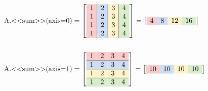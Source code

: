 \begin{align*}
\text{\li{A.<<sum>>(axis=0)}} &= %
\left[\begin{array}{>{\columncolor{red!20}}c|>{\columncolor{blue!20}}c|>{\columncolor{yellow!20}}c|>{\columncolor{green!20}}c}
1 & 2 & 3 & 4\\
1 & 2 & 3 & 4\\
1 & 2 & 3 & 4\\
1 & 2 & 3 & 4
\end{array}\right]
= \left[\begin{array}{cccc} \cellcolor{red!20}4 & \cellcolor{blue!20}8 & \cellcolor{yellow!20}12 & \cellcolor{green!20}16 \end{array}\right]
\\ \\
\text{\li{A.<<sum>>(axis=1)}} &= %
\left[\begin{array}{cccc}
\rowcolor{red!20} 1 & 2 & 3 & 4\\ \hline
\rowcolor{blue!20} 1 & 2 & 3 & 4\\ \hline
\rowcolor{yellow!20} 1 & 2 & 3 & 4\\ \hline
\rowcolor{green!20} 1 & 2 & 3 & 4\\
\end{array}\right]
= \left[\begin{array}{cccc} \cellcolor{red!20}10 & \cellcolor{blue!20}10 & \cellcolor{yellow!20}10 & \cellcolor{green!20}10 \end{array}\right]
\end{align*}
